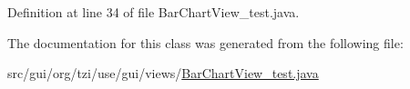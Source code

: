 Definition at line 34 of file Bar\-Chart\-View\-\_\-test.\-java.



The documentation for this class was generated from the following file\-:\begin{DoxyCompactItemize}
\item 
src/gui/org/tzi/use/gui/views/\hyperlink{_bar_chart_view__test_8java}{Bar\-Chart\-View\-\_\-test.\-java}\end{DoxyCompactItemize}
